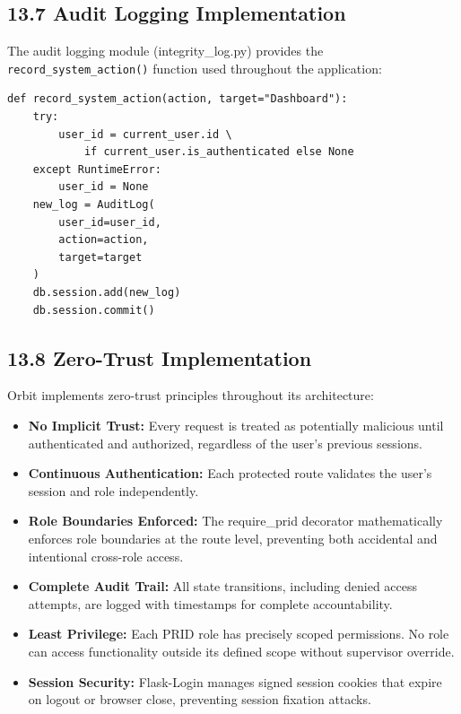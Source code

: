 ﻿\documentclass[12pt]{article}
\begin{document}
\subsection*{13.7 Audit Logging Implementation}
The audit logging module (integrity\_log.py) provides the \texttt{record\_system\_action()} function used throughout the application:

\begin{lstlisting}[style=pycode]
def record_system_action(action, target="Dashboard"):
    try:
        user_id = current_user.id \
            if current_user.is_authenticated else None
    except RuntimeError:
        user_id = None
    new_log = AuditLog(
        user_id=user_id,
        action=action,
        target=target
    )
    db.session.add(new_log)
    db.session.commit()
\end{lstlisting}

\subsection*{13.8 Zero-Trust Implementation}
Orbit implements zero-trust principles throughout its architecture:
\begin{itemize}
\item \textbf{No Implicit Trust:} Every request is treated as potentially malicious until authenticated and authorized, regardless of the user's previous sessions.
\item \textbf{Continuous Authentication:} Each protected route validates the user's session and role independently.
\item \textbf{Role Boundaries Enforced:} The require\_prid decorator mathematically enforces role boundaries at the route level, preventing both accidental and intentional cross-role access.
\item \textbf{Complete Audit Trail:} All state transitions, including denied access attempts, are logged with timestamps for complete accountability.
\item \textbf{Least Privilege:} Each PRID role has precisely scoped permissions. No role can access functionality outside its defined scope without supervisor override.
\item \textbf{Session Security:} Flask-Login manages signed session cookies that expire on logout or browser close, preventing session fixation attacks.
\end{itemize}
\end{document}
